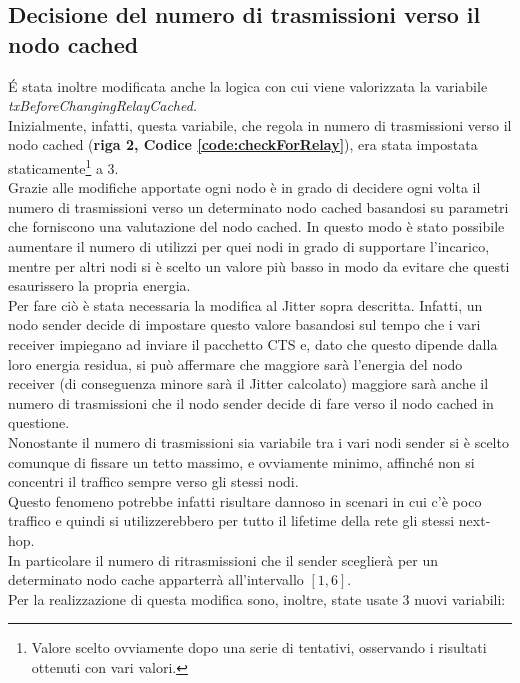 \subsection{Decisione del numero di trasmissioni verso il nodo cached}
\'E stata inoltre modificata anche la logica con cui viene valorizzata la variabile \textit{txBeforeChangingRelayCached}.\\
Inizialmente, infatti, questa variabile, che regola in numero di trasmissioni verso il nodo cached (\textbf{riga 2, Codice \ref{code:checkForRelay}}), era stata impostata staticamente\footnote{Valore scelto ovviamente dopo una serie di tentativi, osservando i risultati ottenuti con vari valori.} a 3.\\
Grazie alle modifiche apportate ogni nodo è in grado di decidere ogni volta il numero di trasmissioni verso un determinato nodo cached basandosi su parametri che forniscono una valutazione del nodo cached. In questo modo è stato possibile aumentare il numero di utilizzi per quei nodi in grado di supportare l'incarico, mentre per altri nodi si è scelto un valore più basso in modo da evitare che questi esaurissero la propria energia.\\ 

Per fare ciò è stata necessaria la modifica al Jitter sopra descritta. Infatti, un nodo sender decide di impostare questo valore basandosi sul tempo che i vari receiver impiegano ad inviare il pacchetto CTS e, dato che questo dipende dalla loro energia residua, si può affermare che maggiore sarà l'energia del nodo receiver (di conseguenza minore sarà il Jitter calcolato) maggiore sarà anche il numero di trasmissioni che il nodo sender decide di fare verso il nodo cached in questione.\\

Nonostante il numero di trasmissioni sia variabile tra i vari nodi sender si è scelto comunque di fissare un tetto massimo, e ovviamente minimo, affinché non si concentri il traffico sempre verso gli stessi nodi.\\ Questo fenomeno potrebbe infatti risultare dannoso in scenari in cui c'è poco traffico e quindi si utilizzerebbero per tutto il lifetime della rete gli stessi next-hop.\\
In particolare il numero di ritrasmissioni che il sender sceglierà per un determinato nodo cache apparterrà all'intervallo \([1, 6]\).\\
Per la realizzazione di questa modifica sono, inoltre, state usate 3 nuovi variabili:


